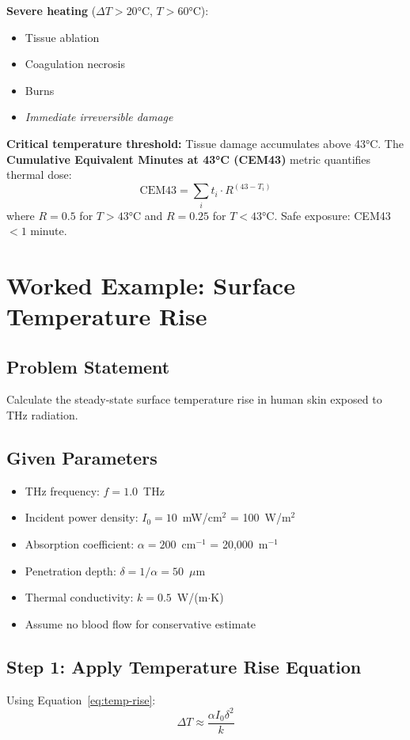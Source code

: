 \textbf{Severe heating} ($\Delta T > 20°$C, $T > 60°$C):
\begin{itemize}
\item Tissue ablation
\item Coagulation necrosis
\item Burns
\item \textit{Immediate irreversible damage}
\end{itemize}

\begin{warningbox}
\textbf{Critical temperature threshold:} Tissue damage accumulates above 43°C. The \textbf{Cumulative Equivalent Minutes at 43°C (CEM43)} metric quantifies thermal dose:
\begin{equation}
\text{CEM43} = \sum_i t_i \cdot R^{(43 - T_i)}
\end{equation}
where $R = 0.5$ for $T > 43°$C and $R = 0.25$ for $T < 43°$C. Safe exposure: CEM43 $< 1$ minute.
\end{warningbox}

\section{Worked Example: Surface Temperature Rise}
\label{sec:example-thermal}

\subsection*{Problem Statement}
Calculate the steady-state surface temperature rise in human skin exposed to THz radiation.

\subsection*{Given Parameters}
\begin{itemize}
\item THz frequency: $f = 1.0$~THz
\item Incident power density: $I_0 = 10$~mW/cm$^2$ = 100~W/m$^2$
\item Absorption coefficient: $\alpha = 200$~cm$^{-1}$ = 20,000~m$^{-1}$
\item Penetration depth: $\delta = 1/\alpha = 50$~$\mu$m
\item Thermal conductivity: $k = 0.5$~W/(m$\cdot$K)
\item Assume no blood flow for conservative estimate
\end{itemize}

\subsection*{Step 1: Apply Temperature Rise Equation}
Using Equation~\ref{eq:temp-rise}:
\begin{equation}
\Delta T \approx \frac{\alpha I_0 \delta^2}{k}
\end{equation}

